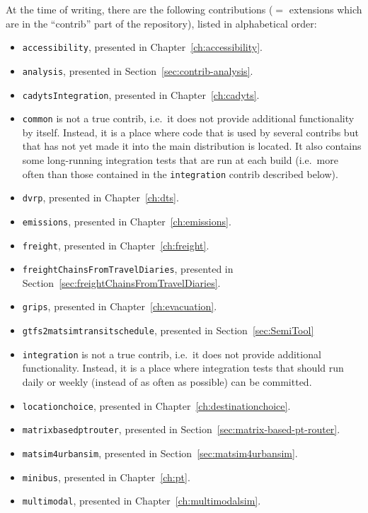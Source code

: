 At the time of writing, there are the following \glspl{contribution} ($=$ extensions which are in the ``contrib'' part of the repository), listed in alphabetical order:
\begin{itemize}\styleItemize
\item \lstinline{accessibility},  
presented in Chapter~\ref{ch:accessibility}.
\item \lstinline{analysis}, presented in Section~\ref{sec:contrib-analysis}.
\item \lstinline{cadytsIntegration}, 
presented in Chapter~\ref{ch:cadyts}.
\item \lstinline{common} is not a true contrib, i.e.\ it does not provide additional functionality by itself.  Instead, it is a place where code that is used by several contribs but that has not yet made it into the main distribution is located.  It also contains some long-running integration tests that are run at each build (i.e.\ more often than those contained in the \lstinline{integration} contrib described below).
\item \lstinline{dvrp}, presented in Chapter~\ref{ch:dts}.
\item \lstinline{emissions}, presented in Chapter~\ref{ch:emissions}.
\item \lstinline{freight}, presented in Chapter~\ref{ch:freight}.
\item \lstinline{freightChainsFromTravelDiaries}, presented in Section~\ref{sec:freightChainsFromTravelDiaries}.
\item \lstinline{grips}, presented in Chapter~\ref{ch:evacuation}.
\item \lstinline{gtfs2matsimtransitschedule}, presented in Section~\ref{sec:SemiTool}
\item \lstinline{integration} is not a true contrib, i.e.\ it does not provide additional functionality.  Instead, it is a place where integration tests that should run daily or weekly (instead of as often as possible) can be committed.
\item \lstinline{locationchoice}, presented in Chapter~\ref{ch:destinationchoice}.
\item \lstinline{matrixbasedptrouter}, presented in Section~\ref{sec:matrix-based-pt-router}.
\item \lstinline{matsim4urbansim}, presented in Section~\ref{sec:matsim4urbansim}.
\item \lstinline{minibus}, presented in Chapter~\ref{ch:pt}.
\item \lstinline{multimodal}, presented in Chapter~\ref{ch:multimodalsim}.

\end{itemize}
